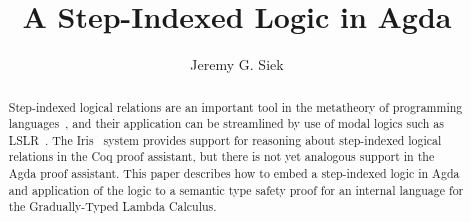 \documentclass[acmsmall]{acmart}
\begin{document}
\title{A Step-Indexed Logic in Agda}

\author{Jeremy G. Siek}



\begin{abstract}
  Step-indexed logical relations are an important tool in the
  metatheory of programming
  languages~\citep{Appel:2001aa,Ahmed:2006aa}, and their application
  can be streamlined by use of modal logics such as
  LSLR~\citep{Dreyer:2011wl}.  The Iris~\citep{JUNG:2018aa} system
  provides support for reasoning about step-indexed logical relations
  in the Coq proof assistant, but there is not yet analogous support
  in the Agda proof assistant. This paper describes how to embed a
  step-indexed logic in Agda and application of the logic to a
  semantic type safety proof for an internal language for the
  Gradually-Typed Lambda Calculus.
\end{abstract}

\end{document}
